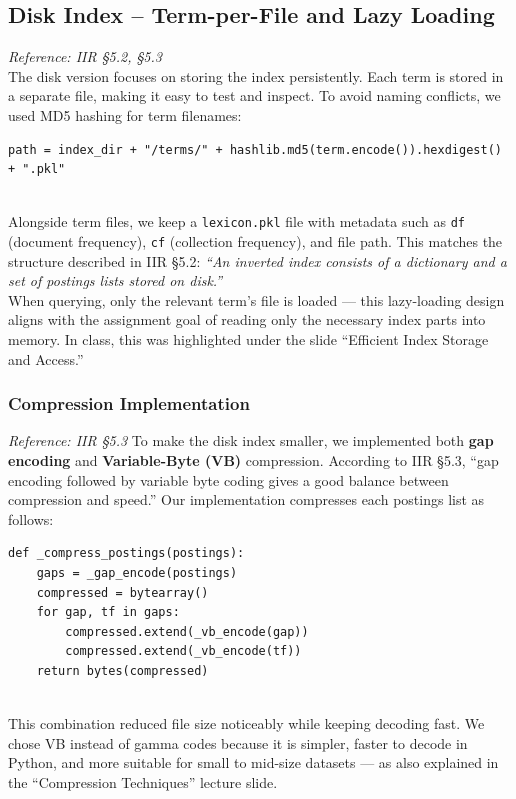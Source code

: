 \documentclass[11pt,a4paper]{article}
\begin{document}
\subsection{Disk Index – Term-per-File and Lazy Loading}
\label{subsec:disk}
\textit{Reference: IIR §5.2, §5.3}
\\
The disk version focuses on storing the index persistently.
Each term is stored in a separate file, making it easy to test and inspect.
To avoid naming conflicts, we used MD5 hashing for term filenames:
\begin{verbatim}
path = index_dir + "/terms/" + hashlib.md5(term.encode()).hexdigest() + ".pkl"
\end{verbatim}
\\
Alongside term files, we keep a \texttt{lexicon.pkl} file with metadata such as 
\texttt{df} (document frequency), \texttt{cf} (collection frequency), and file path.
This matches the structure described in IIR §5.2:  
\textit{“An inverted index consists of a dictionary and a set of postings lists stored on disk.”}
\\
When querying, only the relevant term’s file is loaded —  
this lazy-loading design aligns with the assignment goal of reading only the necessary index parts into memory.
In class, this was highlighted under the slide “Efficient Index Storage and Access.”

\subsubsection{Compression Implementation}
\label{subsubsec:compression}
\textit{Reference: IIR §5.3}
To make the disk index smaller, we implemented both \textbf{gap encoding} and \textbf{Variable-Byte (VB)} compression.
According to IIR §5.3, “gap encoding followed by variable byte coding gives a good balance between compression and speed.”
Our implementation compresses each postings list as follows:
\begin{verbatim}
def _compress_postings(postings):
    gaps = _gap_encode(postings)
    compressed = bytearray()
    for gap, tf in gaps:
        compressed.extend(_vb_encode(gap))
        compressed.extend(_vb_encode(tf))
    return bytes(compressed)
\end{verbatim}
\\
This combination reduced file size noticeably while keeping decoding fast.
We chose VB instead of gamma codes because it is simpler, faster to decode in Python, and more suitable for small to mid-size datasets — 
as also explained in the “Compression Techniques” lecture slide.
\end{document}
